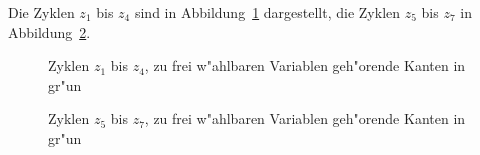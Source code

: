 \begin{loesung}
\[\]
Die Zyklen $z_1$ bis $z_4$ sind in Abbildung~\ref{10000028:z1bisz4}
dargestellt, die Zyklen $z_5$ bis $z_7$ in Abbildung~\ref{10000028:z5bisz7}.
\begin{figure}
\centering
{}
\caption{Zyklen $z_1$ bis $z_4$, zu frei w"ahlbaren Variablen geh"orende Kanten
in gr"un
\label{10000028:z1bisz4}}
\end{figure}
\begin{figure}
\centering
{}
\caption{Zyklen $z_5$ bis $z_7$, zu frei w"ahlbaren Variablen geh"orende Kanten
in gr"un
\label{10000028:z5bisz7}}
\end{figure}

\end{loesung}

